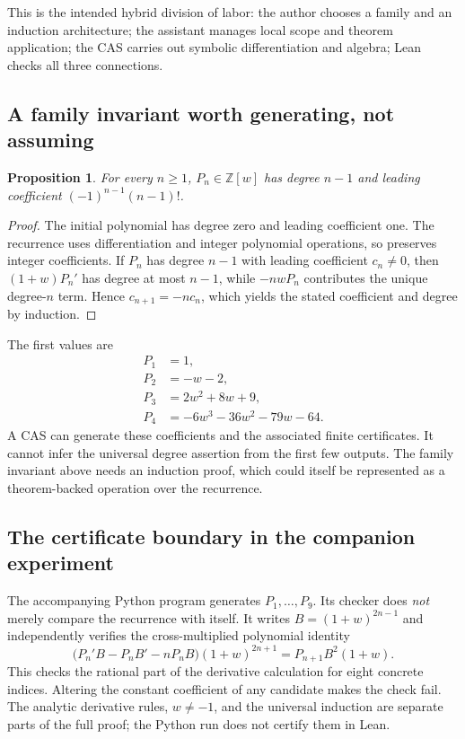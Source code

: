 \documentclass[11pt,a4paper]{article}
\newcommand{\Z}{\mathbb Z}
\newtheorem{proposition}{Proposition}[section]
\theoremstyle{definition}
\theoremstyle{remark}
\begin{document}
This is the intended hybrid division of labor: the author chooses a family and an induction architecture; the assistant manages local scope and theorem application; the CAS carries out symbolic differentiation and algebra; Lean checks all three connections.

\subsection{A family invariant worth generating, not assuming}
\begin{proposition}
For every $n\ge1$, $P_n\in\Z[w]$ has degree $n-1$ and leading coefficient $(-1)^{n-1}(n-1)!$.
\end{proposition}
\begin{proof}
The initial polynomial has degree zero and leading coefficient one. The recurrence uses differentiation and integer polynomial operations, so preserves integer coefficients. If $P_n$ has degree $n-1$ with leading coefficient $c_n\ne0$, then $(1+w)P_n'$ has degree at most $n-1$, while $-nwP_n$ contributes the unique degree-$n$ term. Hence $c_{n+1}=-nc_n$, which yields the stated coefficient and degree by induction.
\end{proof}
The first values are
\begin{align*}
P_1&=1,\\
P_2&=-w-2,\\
P_3&=2w^2+8w+9,\\
P_4&=-6w^3-36w^2-79w-64.
\end{align*}
A CAS can generate these coefficients and the associated finite certificates. It cannot infer the universal degree assertion from the first few outputs. The family invariant above needs an induction proof, which could itself be represented as a theorem-backed operation over the recurrence.

\subsection{The certificate boundary in the companion experiment}
The accompanying Python program generates $P_1,\ldots,P_9$. Its checker does \emph{not} merely compare the recurrence with itself. It writes $B=(1+w)^{2n-1}$ and independently verifies the cross-multiplied polynomial identity
\begin{equation}\label{eq:crosscert}
\bigl(P_n'B-P_nB'-nP_nB\bigr)(1+w)^{2n+1}
 =P_{n+1}B^2(1+w).
\end{equation}
This checks the rational part of the derivative calculation for eight concrete indices. Altering the constant coefficient of any candidate makes the check fail. The analytic derivative rules, $w\ne-1$, and the universal induction are separate parts of the full proof; the Python run does not certify them in Lean.
\end{document}
